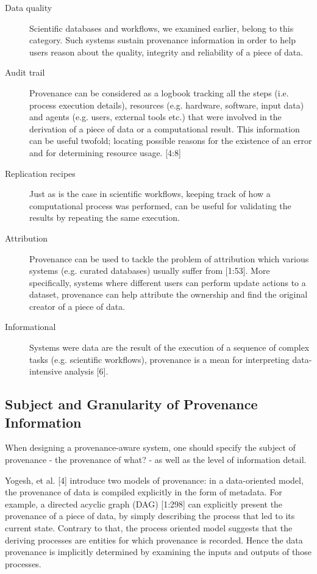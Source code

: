 \begin{description}
  \item[Data quality]
        Scientific databases and workflows, we examined earlier, belong to this category. Such systems sustain provenance information in order to help users reason about the quality, integrity and reliability of a piece of data.
  \item[Audit trail]
        Provenance can be considered as a logbook tracking all the steps (i.e. process execution details), resources (e.g. hardware, software, input data) and agents (e.g. users, external tools etc.) that were involved in the derivation of a piece of data or a computational result. This information can be useful twofold; locating possible reasons for the existence of an error and for determining resource usage. [4:8]
  \item[Replication recipes]
        Just as is the case in scientific workflows, keeping track of how a computational process was performed, can be useful for validating the results by repeating the same execution.
  \item[Attribution]
        Provenance can be used to tackle the problem of attribution which various systems (e.g. curated databases) usually suffer from [1:53]. More specifically, systems where different users can perform update actions to a dataset, provenance can help attribute the ownership and find the original creator of a piece of data.
  \item[Informational]
        Systems were data are the result of the execution of a sequence of complex tasks (e.g. scientific workflows), provenance is a mean for interpreting data-intensive analysis [6].
\end{description}

\subsection{Subject and Granularity of Provenance Information}

When designing a provenance-aware system, one should specify the subject of provenance - the provenance of what? -  as well as the level of information detail.

Yogesh, et al. [4] introduce two models of provenance: in a data-oriented model, the provenance of data is compiled explicitly in the form of metadata. For example, a directed acyclic graph (DAG)  [1:298] can explicitly present the provenance of a piece of data, by simply describing the process that led to its current state.  Contrary to that, the process oriented model suggests that the deriving processes are entities for which provenance is recorded.  Hence the data provenance is implicitly determined by examining the inputs and outputs of those processes.

